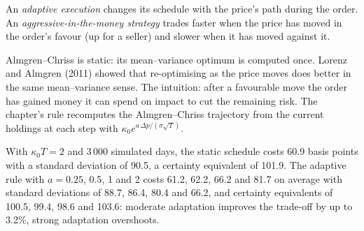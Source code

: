 \begin{definition}\label{def:mx:beyond-almgren-chriss:adaptive}
An \emph{adaptive execution} changes its schedule with the price's path during the order. An \emph{aggressive-in-the-money
strategy} trades faster when the price has moved in the order's favour (up for a seller) and slower when it has
moved against it.
\end{definition}

Almgren--Chriss is static: its mean--variance optimum is computed once. Lorenz and Almgren (2011) showed that re-optimising as the price moves does better
in the same mean--variance sense. The intuition: after a favourable move the order has gained money it can spend on impact to cut the remaining risk.
The chapter's rule recomputes the Almgren--Chriss trajectory from the current holdings at each step with  $\kappa_0e^{a\,\Delta p/(\sigma\sqrt T)}$.

\label{lst:mx:beyond-almgren-chriss:aim}

With $\kappa_0T=2$ and 3\,000 simulated days, the static schedule costs 60.9 basis points with a standard deviation of 90.5, a certainty equivalent of 101.9. The
adaptive rule with $a=0.25$, 0.5, 1 and 2 costs 61.2, 62.2, 66.2 and 81.7 on average with standard deviations of 88.7, 86.4, 80.4 and 66.2, and certainty
equivalents of 100.5, 99.4, 98.6 and 103.6: moderate adaptation improves the trade-off by up to 3.2\%, strong adaptation overshoots.

\begin{omfigure}

\label{fig:mx:beyond-almgren-chriss:aim}
\end{omfigure}

